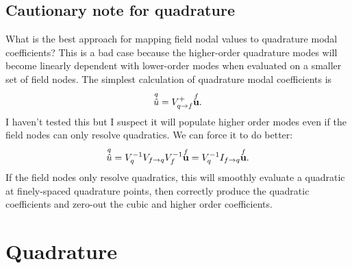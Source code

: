 \subsection{Cautionary note for quadrature}

What is the best approach for mapping field nodal values to quadrature modal coefficients?  This is a bad case because the higher-order quadrature modes will become linearly dependent with lower-order modes when evaluated on a smaller set of field nodes.  The simplest calculation of quadrature modal coefficients is
%
\begin{equation}
\overset{q}{\hat u} = V_{q \rightarrow f}^+ \overset{f}{\textbf{u}}.
\end{equation}
%
I haven't tested this but I suspect it will populate higher order modes even if the field nodes can only resolve quadratics.  We can force it to do better:
%
\begin{equation}
\overset{q}{\hat u} = V_q^{-1} V_{f \rightarrow q} V_f^{-1} \overset{f}{\textbf{u}} = V_q^{-1} I_{f \rightarrow q} \overset{f}{\textbf{u}}.
\end{equation}
%
If the field nodes only resolve quadratics, this will smoothly evaluate a quadratic at finely-spaced quadrature points, then correctly produce the quadratic coefficients and zero-out the cubic and higher order coefficients.

\section{Quadrature}

